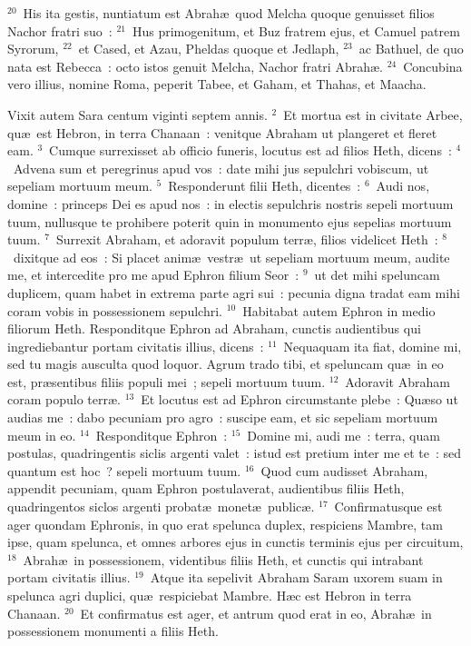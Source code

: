 ${}^{20}$~His ita gestis, nuntiatum est Abrah\ae\ quod Melcha quoque genuisset filios Nachor fratri suo~:
${}^{21}$~Hus primogenitum, et Buz fratrem ejus, et Camuel patrem Syrorum,
${}^{22}$~et Cased, et Azau, Pheldas quoque et Jedlaph,
${}^{23}$~ac Bathuel, de quo nata est Rebecca~: octo istos genuit Melcha, Nachor fratri Abrah\ae .
${}^{24}$~Concubina vero illius, nomine Roma, peperit Tabee, et Gaham, et Thahas, et Maacha.

\lettrine[lines=3,image=true,loversize=0.05,lraise=-0.03]{V}{}ixit autem Sara centum viginti septem annis.
${}^{2}$~Et mortua est in civitate Arbee, qu\ae\ est Hebron, in terra Chanaan~: venitque Abraham ut plangeret et fleret eam.
${}^{3}$~Cumque surrexisset ab officio funeris, locutus est ad filios Heth, dicens~:
${}^{4}$~Advena sum et peregrinus apud vos~: date mihi jus sepulchri vobiscum, ut sepeliam mortuum meum.
${}^{5}$~Responderunt filii Heth, dicentes~:
${}^{6}$~Audi nos, domine~: princeps Dei es apud nos~: in electis sepulchris nostris sepeli mortuum tuum, nullusque te prohibere poterit quin in monumento ejus sepelias mortuum tuum.
${}^{7}$~Surrexit Abraham, et adoravit populum terr\ae , filios videlicet Heth~:
${}^{8}$~dixitque ad eos~: Si placet anim\ae\ vestr\ae\ ut sepeliam mortuum meum, audite me, et intercedite pro me apud Ephron filium Seor~:
${}^{9}$~ut det mihi speluncam duplicem, quam habet in extrema parte agri sui~: pecunia digna tradat eam mihi coram vobis in possessionem sepulchri.
${}^{10}$~Habitabat autem Ephron in medio filiorum Heth. Responditque Ephron ad Abraham, cunctis audientibus qui ingrediebantur portam civitatis illius, dicens~:
${}^{11}$~Nequaquam ita fiat, domine mi, sed tu magis ausculta quod loquor. Agrum trado tibi, et speluncam qu\ae\ in eo est, pr\ae sentibus filiis populi mei~; sepeli mortuum tuum.
${}^{12}$~Adoravit Abraham coram populo terr\ae .
${}^{13}$~Et locutus est ad Ephron circumstante plebe~: Qu\ae so ut audias me~: dabo pecuniam pro agro~: suscipe eam, et sic sepeliam mortuum meum in eo.
${}^{14}$~Responditque Ephron~:
${}^{15}$~Domine mi, audi me~: terra, quam postulas, quadringentis siclis argenti valet~: istud est pretium inter me et te~: sed quantum est hoc~? sepeli mortuum tuum.
${}^{16}$~Quod cum audisset Abraham, appendit pecuniam, quam Ephron postulaverat, audientibus filiis Heth, quadringentos siclos argenti probat\ae\ monet\ae\ public\ae .
${}^{17}$~Confirmatusque est ager quondam Ephronis, in quo erat spelunca duplex, respiciens Mambre, tam ipse, quam spelunca, et omnes arbores ejus in cunctis terminis ejus per circuitum,
${}^{18}$~Abrah\ae\ in possessionem, videntibus filiis Heth, et cunctis qui intrabant portam civitatis illius.
${}^{19}$~Atque ita sepelivit Abraham Saram uxorem suam in spelunca agri duplici, qu\ae\ respiciebat Mambre. H\ae c est Hebron in terra Chanaan.
${}^{20}$~Et confirmatus est ager, et antrum quod erat in eo, Abrah\ae\ in possessionem monumenti a filiis Heth.

